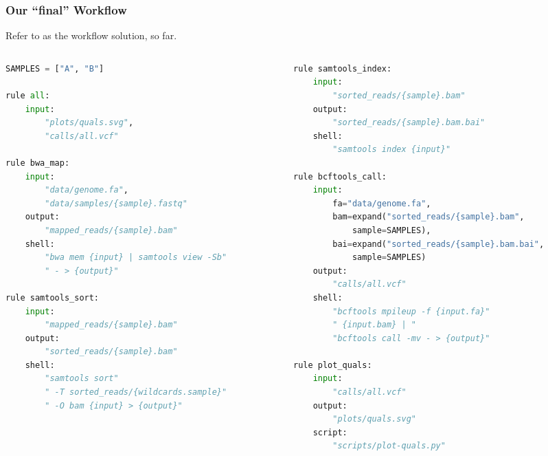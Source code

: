 \begin{frame}[fragile]
  \frametitle{Our ``final'' Workflow}
  \footnotesize{Refer to  as the workflow solution, so far.}
  \vspace{-1em}
  \begin{columns}
    \begin{column}{0.5\textwidth}
      \begin{lstlisting}[language=Python,style=Python,basicstyle=\tiny]
SAMPLES = ["A", "B"]

rule all:
    input:
        "plots/quals.svg",
        "calls/all.vcf"

rule bwa_map:
    input:
        "data/genome.fa",
        "data/samples/{sample}.fastq"
    output:
        "mapped_reads/{sample}.bam"
    shell:
        "bwa mem {input} | samtools view -Sb"
        " - > {output}"

rule samtools_sort:
    input:
        "mapped_reads/{sample}.bam"
    output:
        "sorted_reads/{sample}.bam"
    shell:
        "samtools sort"
        " -T sorted_reads/{wildcards.sample}"
        " -O bam {input} > {output}"
      \end{lstlisting}
    \end{column}
    \begin{column}{0.5\textwidth}
      \begin{lstlisting}[language=Python,style=Python,basicstyle=\tiny]
rule samtools_index:
    input:
        "sorted_reads/{sample}.bam"
    output:
        "sorted_reads/{sample}.bam.bai"
    shell:
        "samtools index {input}"

rule bcftools_call:
    input:
        fa="data/genome.fa",
        bam=expand("sorted_reads/{sample}.bam",
            sample=SAMPLES),
        bai=expand("sorted_reads/{sample}.bam.bai",
            sample=SAMPLES)
    output:
        "calls/all.vcf"
    shell:
        "bcftools mpileup -f {input.fa}"
        " {input.bam} | "
        "bcftools call -mv - > {output}"

rule plot_quals:
    input:
        "calls/all.vcf"
    output:
        "plots/quals.svg"
    script:
        "scripts/plot-quals.py"
      \end{lstlisting}
    \end{column}
  \end{columns}
\end{frame}


